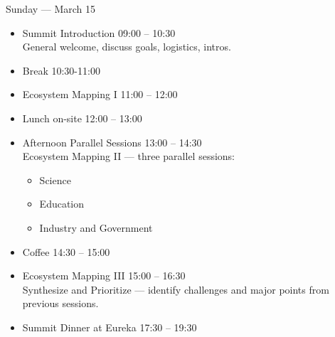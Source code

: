 \documentclass[11pt, aspectratio=169]{beamer}
\begin{document}
\begin{frame}{Sunday — March 15}
  \large
  \begin{itemize}
    \item Summit Introduction \hfill 09:00 -- 10:30\\
      \quad General welcome, discuss goals, logistics, intros.  
    \item Break \hfill 10:30-11:00\\
    \item Ecosystem Mapping I \hfill 11:00 -- 12:00\\
    \item Lunch on-site \hfill 12:00 -- 13:00
    \item Afternoon Parallel Sessions \hfill 13:00 -- 14:30\\
      Ecosystem Mapping II — three parallel sessions:
      \begin{itemize}
        \item Science
        \item Education
        \item Industry and Government
      \end{itemize}
    \item Coffee \hfill 14:30 -- 15:00
    \item Ecosystem Mapping III \hfill 15:00 -- 16:30\\
      \quad Synthesize and Prioritize — identify challenges and major points from previous sessions.
    \item Summit Dinner at Eureka \hfill 17:30 -- 19:30
  \end{itemize}

\end{frame}
\end{document}
